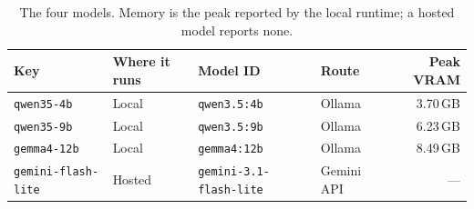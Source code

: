\begin{table}[htbp]
\centering
\caption{The four models. Memory is the peak reported by the local runtime; a hosted model reports none.}
\label{tab:models}
\begin{tabular}{@{}llllr@{}}
\toprule
Key & Where it runs & Model ID & Route & Peak VRAM \\
\midrule
\texttt{qwen35-4b} & Local & \texttt{qwen3.5:4b} & Ollama & 3.70\,GB \\
\texttt{qwen35-9b} & Local & \texttt{qwen3.5:9b} & Ollama & 6.23\,GB \\
\texttt{gemma4-12b} & Local & \texttt{gemma4:12b} & Ollama & 8.49\,GB \\
\texttt{gemini-flash-lite} & Hosted & \texttt{gemini-3.1-flash-lite} & Gemini API & --- \\
\bottomrule
\end{tabular}
\end{table}
